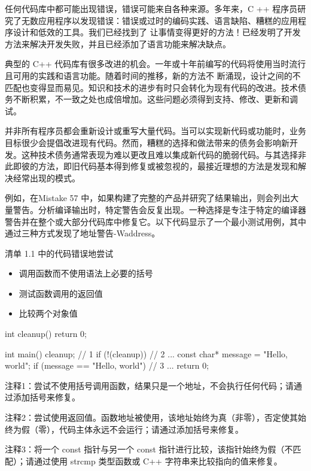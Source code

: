 
任何代码库中都可能出现错误，错误可能来自各种来源。多年来，C ++ 程序员研究了无数应用程序以发现错误：错误或过时的编码实践、语言缺陷、糟糕的应用程序设计和低效的工具。我们已经找到了 让事情变得更好的方法！已经发明了开发方法来解决开发失败，并且已经添加了语言功能来解决缺点。

典型的 C++ 代码库有很多改进的机会。一年或十年前编写的代码将使用当时流行且可用的实践和语言功能。随着时间的推移，新的方法不 断涌现，设计之间的不匹配也变得显而易见。知识和技术的进步有时只会转化为现有代码的改进。技术债务不断积累，不一致之处也成倍增加。这些问题必须得到支持、修改、更新和调试。

并非所有程序员都会重新设计或重写大量代码。当可以实现新代码或功能时，业务目标很少会提倡改进现有代码。然而，糟糕的选择和做法带来的债务会影响新开发。这种技术债务通常表现为难以更改且难以集成新代码的脆弱代码。与其选择非此即彼的方法，即旧代码基本得到修复或被忽视的，最接近理想的方法是发现和解决经常出现的模式。


例如，在Mistake 57 中，如果构建了完整的产品并研究了结果输出，则会列出大量警告。分析编译输出时，特定警告会反复出现。一种选择是专注于特定的编译器警告并在整个或大部分代码库中修复它。以下代码显示了一个最小测试用例，其中通过三种方式发现了地址警告-Waddress。

清单 1.1 中的代码错误地尝试

\begin{itemize}
\item
调用函数而不使用语法上必要的括号

\item
测试函数调用的返回值

\item
比较两个对象值
\end{itemize}


\begin{cpp}
int cleanup() {
    return 0;
}

int main() {
    cleanup; // 1
    if (!(cleanup)) { // 2
       ...
    }
    const char* message = "Hello, world";
    if (message == "Hello, world") { // 3
       ...
    }
    return 0;
}
\end{cpp}

{\footnotesize
注释1：尝试不使用括号调用函数，结果只是一个地址，不会执行任何代码；请通过添加括号来修复。

注释2：尝试使用返回值。函数地址被使用，该地址始终为真（非零），否定使其始终为假（零），代码主体永远不会运行；请通过添加括号来修复。

注释3：将一个 const 指针与另一个 const 指针进行比较，该指针始终为假（不匹配）；请通过使用 strcmp 类型函数或 C++ 字符串来比较指向的值来修复。
}

